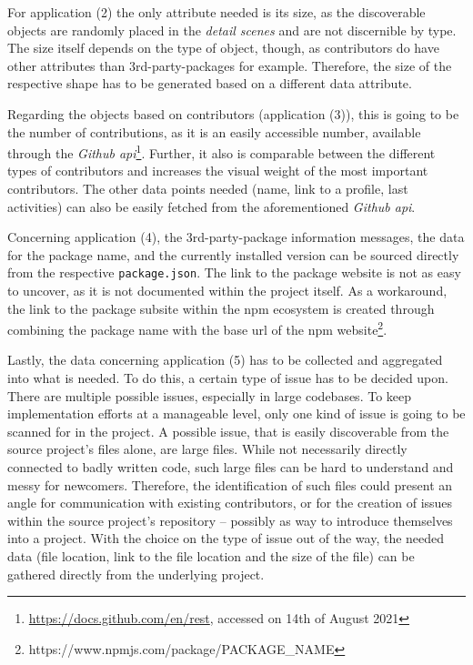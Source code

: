 For application (2) the only attribute needed is its size, as the discoverable objects are randomly placed in the \textit{detail scenes} and are not discernible by type. The size itself depends on the type of object, though, as contributors do have other attributes than 3rd-party-packages for example. Therefore, the size of the respective shape has to be generated based on a different data attribute.

Regarding the objects based on contributors (application (3)), this is going to be the number of contributions, as it is an easily accessible number, available through the \textit{Github \gls{api}}\footnote{\url{https://docs.github.com/en/rest}, accessed on 14th of August 2021}. Further, it also is comparable between the different types of contributors and increases the visual weight of the most important contributors. The other data points needed (name, link to a profile, last activities) can also be easily fetched from the aforementioned \textit{Github \gls{api}}.

Concerning application (4), the 3rd-party-package information messages, the data for the package name, and the currently installed version can be sourced directly from the respective \verb|package.json|. The link to the package website is not as easy to uncover, as it is not documented within the project itself. As a workaround, the link to the package subsite within the \gls{npm} ecosystem is created through combining the package name with the base \gls{url} of the \gls{npm} website\footnote{https://www.npmjs.com/package/PACKAGE\_NAME}.

Lastly, the data concerning application (5) has to be collected and aggregated into what is needed. To do this, a certain type of issue has to be decided upon. There are multiple possible issues, especially in large codebases. To keep implementation efforts at a manageable level, only one kind of issue is going to be scanned for in the project. A possible issue, that is easily discoverable from the source project's files alone, are large files. While not necessarily directly connected to badly written code, such large files can be hard to understand and messy \cite{so2012large} for newcomers. Therefore, the identification of such files could present an angle for communication with existing contributors, or for the creation of issues within the source project's repository -- possibly as way to introduce themselves into a project. With the choice on the type of issue out of the way, the needed data (file location, link to the file location and the size of the file) can be gathered directly from the underlying project.

